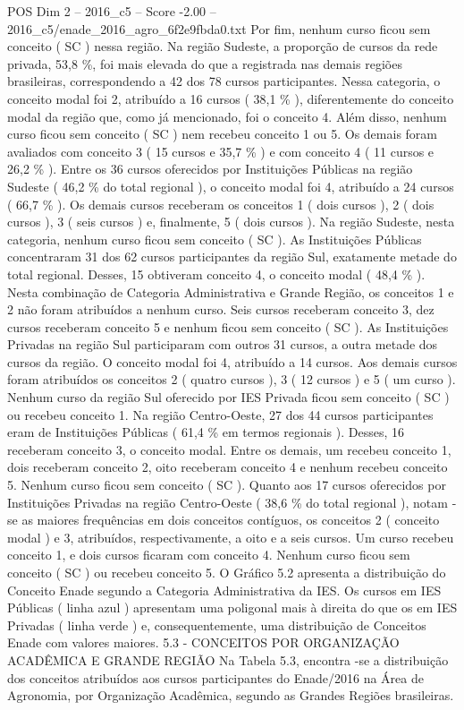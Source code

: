 \begin{textsample}{POS Dim 2 – 2016\_c5 – Score -2.00 – 2016\_c5/enade\_2016\_agro\_6f2e9fbda0.txt}
Por fim, nenhum curso ficou sem conceito ( SC ) nessa região.
Na região Sudeste, a proporção de cursos da rede privada, 53,8 \%, foi mais elevada do que a registrada nas demais regiões brasileiras, correspondendo a 42 dos 78 cursos participantes.
Nessa categoria, o conceito modal foi 2, atribuído a 16 cursos ( 38,1 \% ), diferentemente do conceito modal da região que, como já mencionado, foi o conceito 4.
Além disso, nenhum curso ficou sem conceito ( SC ) nem recebeu conceito 1 ou 5.
Os demais foram avaliados com conceito 3 ( 15 cursos e 35,7 \% ) e com conceito 4 ( 11 cursos e 26,2 \% ).
Entre os 36 cursos oferecidos por Instituições Públicas na região Sudeste ( 46,2 \% do total regional ), o conceito modal foi 4, atribuído a 24 cursos ( 66,7 \% ).
Os demais cursos receberam os conceitos 1 ( dois cursos ), 2 ( dois cursos ), 3 ( seis cursos ) e, finalmente, 5 ( dois cursos ).
Na região Sudeste, nesta categoria, nenhum curso ficou sem conceito ( SC ).
As Instituições Públicas concentraram 31 dos 62 cursos participantes da região Sul, exatamente metade do total regional.
Desses, 15 obtiveram conceito 4, o conceito modal ( 48,4 \% ).
Nesta combinação de Categoria Administrativa e Grande Região, os conceitos 1 e 2 não foram atribuídos a nenhum curso.
Seis cursos receberam conceito 3, dez cursos receberam conceito 5 e nenhum ficou sem conceito ( SC ).
As Instituições Privadas na região Sul participaram com outros 31 cursos, a outra metade dos cursos da região.
O conceito modal foi 4, atribuído a 14 cursos.
Aos demais cursos foram atribuídos os conceitos 2 ( quatro cursos ), 3 ( 12 cursos ) e 5 ( um curso ).
Nenhum curso da região Sul oferecido por IES Privada ficou sem conceito ( SC ) ou recebeu conceito 1.
Na região Centro-Oeste, 27 dos 44 cursos participantes eram de Instituições Públicas ( 61,4 \% em termos regionais ).
Desses, 16 receberam conceito 3, o conceito modal.
Entre os demais, um recebeu conceito 1, dois receberam conceito 2, oito receberam conceito 4 e nenhum recebeu conceito 5.
Nenhum curso ficou sem conceito ( SC ).
Quanto aos 17 cursos oferecidos por Instituições Privadas na região Centro-Oeste ( 38,6 \% do total regional ), notam -se as maiores frequências em dois conceitos contíguos, os conceitos 2 ( conceito modal ) e 3, atribuídos, respectivamente, a oito e a seis cursos.
Um curso recebeu conceito 1, e dois cursos ficaram com conceito 4.
Nenhum curso ficou sem conceito ( SC ) ou recebeu conceito 5.
O Gráfico 5.2 apresenta a distribuição do Conceito Enade segundo a Categoria Administrativa da IES.
Os cursos em IES Públicas ( linha azul ) apresentam uma poligonal mais à direita do que os em IES Privadas ( linha verde ) e, consequentemente, uma distribuição de Conceitos Enade com valores maiores. 5.3 - CONCEITOS POR ORGANIZAÇÃO ACADÊMICA E GRANDE REGIÃO Na Tabela 5.3, encontra -se a distribuição dos conceitos atribuídos aos cursos participantes do Enade/2016 na Área de Agronomia, por Organização Acadêmica, segundo as Grandes Regiões brasileiras.

\end{textsample}
